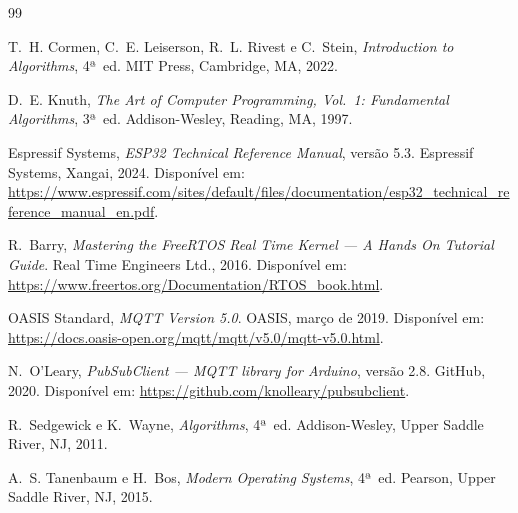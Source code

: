 \documentclass[12pt, a4paper]{article}
\theoremstyle{definition}
\theoremstyle{remark}
\begin{document}
\begin{thebibliography}{99}

T.~H. Cormen, C.~E. Leiserson, R.~L. Rivest e C.~Stein,
\textit{Introduction to Algorithms}, 4ª~ed.
MIT Press, Cambridge, MA, 2022.

D.~E. Knuth,
\textit{The Art of Computer Programming, Vol.~1: Fundamental Algorithms},
3ª~ed.
Addison-Wesley, Reading, MA, 1997.

Espressif Systems,
\textit{ESP32 Technical Reference Manual}, versão 5.3.
Espressif Systems, Xangai, 2024.
Disponível em: \url{https://www.espressif.com/sites/default/files/documentation/esp32_technical_reference_manual_en.pdf}.

R.~Barry,
\textit{Mastering the FreeRTOS Real Time Kernel — A Hands On Tutorial Guide}.
Real Time Engineers Ltd., 2016.
Disponível em: \url{https://www.freertos.org/Documentation/RTOS_book.html}.

OASIS Standard,
\textit{MQTT Version 5.0}.
OASIS, março de 2019.
Disponível em: \url{https://docs.oasis-open.org/mqtt/mqtt/v5.0/mqtt-v5.0.html}.

N.~O'Leary,
\textit{PubSubClient — MQTT library for Arduino}, versão 2.8.
GitHub, 2020.
Disponível em: \url{https://github.com/knolleary/pubsubclient}.

R.~Sedgewick e K.~Wayne,
\textit{Algorithms}, 4ª~ed.
Addison-Wesley, Upper Saddle River, NJ, 2011.

A.~S. Tanenbaum e H.~Bos,
\textit{Modern Operating Systems}, 4ª~ed.
Pearson, Upper Saddle River, NJ, 2015.

\end{thebibliography}

\end{document}
